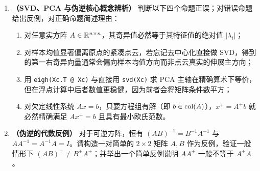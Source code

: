 \begin{enumerate}[label=\textbf{4.\arabic*}, leftmargin=2.4em]
  \item \textbf{（SVD、PCA 与伪逆核心概念辨析）} 判断以下四个命题正误；对错误命题给出反例，对正确命题简述理由：
  \begin{enumerate}[label=(\alph*), leftmargin=1.8em]
    \item 对任意实方阵 $A \in \mathbb{R}^{n\times n}$，其奇异值必然等于其特征值的绝对值 $|\lambda_i|$；
    \item 对样本均值显著偏离原点的紧凑点云，若忘记去中心化直接做 SVD，得到的第一右奇异向量通常会偏向样本均值方向而非点云真实的伸展主方向；
    \item 用 \texttt{eigh(Xc.T @ Xc)} 与直接用 \texttt{svd(Xc)} 求 PCA 主轴在精确算术下等价，但在浮点计算中后者数值更稳健，因为前者会将矩阵条件数平方；
    \item 对欠定线性系统 $Ax = b$，只要方程组有解（即 $b \in \operatorname{col}(A)$），$x^+ = A^+ b$ 就必然精确满足 $Ax^+ = b$ 且具有最小欧氏范数。
  \end{enumerate}

  \item \textbf{（伪逆的代数反例）} 对于可逆方阵，恒有 $(AB)^{-1} = B^{-1}A^{-1}$ 与 $AA^{-1} = A^{-1}A = I$。请构造一对简单的 $2\times 2$ 矩阵 $A, B$ 作为反例，验证一般情形下 $(AB)^+ \neq B^+ A^+$；并举出一个简单反例说明 $A A^+$ 一般不等于 $A^+ A$。
\end{enumerate}


